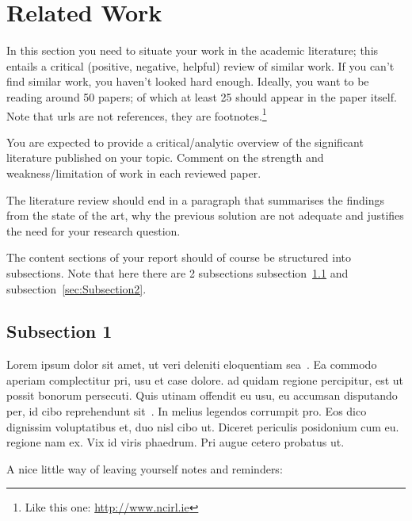 
\section{Related Work}
\label{sec:rw}

In this section you need to situate your work in the academic literature; this entails a critical (positive, negative, helpful) review of similar work. If you can't find similar work, you haven't looked hard enough. Ideally, you want to be reading around 50 papers; of which at least 25 should appear in the paper itself. Note that urls are not references, they are footnotes.\footnote{Like this one: \url{http://www.ncirl.ie}}

You are expected to provide a critical/analytic overview of the significant literature published on your topic. Comment on the strength and weakness/limitation of work in each reviewed paper. 

The literature review should end in  a paragraph that summarises the findings from the state of the art, why the previous solution are not adequate and justifies the need for your research question.

The content sections of your report should of course be structured into subsections. Note that here there are 2 subsections subsection~\ref{sec:Subsection1} and subsection~\ref{sec:Subsection2}.

\subsection{Subsection 1}
\label{sec:Subsection1}

Lorem ipsum dolor sit amet, ut veri deleniti eloquentiam sea~\citep{FengB16}. Ea commodo aperiam complectitur pri, usu et case dolore. \citet{KuneKARB16} ad quidam regione percipitur, est ut possit bonorum persecuti. Quis utinam offendit eu usu, eu accumsan disputando per, id cibo reprehendunt sit~\citep{BeloglazovB15,GomesCT15}. In melius legendos corrumpit pro. Eos dico dignissim voluptatibus et, duo nisl cibo ut. Diceret periculis posidonium cum eu. \citet{GomesCT15} regione nam ex. Vix id viris phaedrum. Pri augue cetero probatus ut.

A nice little way of leaving yourself notes and reminders:



